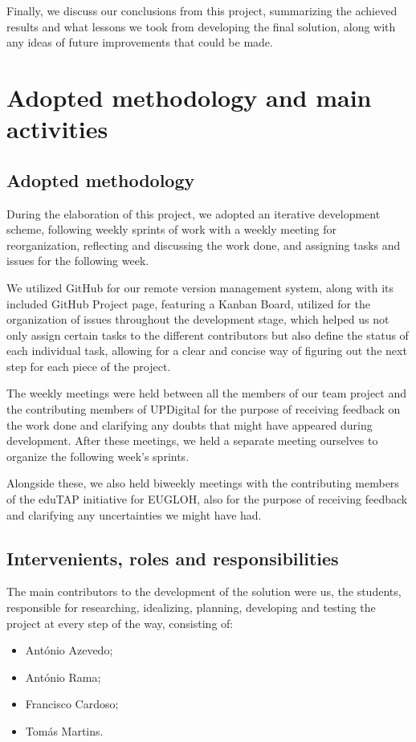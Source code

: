 \documentclass[12pt]{article}
\begin{document}
Finally, we discuss our conclusions from this project, summarizing the achieved results and what lessons we took
from developing the final solution, along with any ideas of future improvements that could be made.

\section{Adopted methodology and main activities}

\subsection{Adopted methodology}

During the elaboration of this project, we adopted an iterative development scheme, following weekly sprints of work with
a weekly meeting for reorganization, reflecting and discussing the work done, and assigning tasks and issues for the following week.

We utilized GitHub\cite{github} for our remote version management system, along with its included GitHub Project\cite{github-project}
page, featuring a Kanban Board\cite{kanban}, utilized for the organization of issues throughout the development stage, which helped
us not only assign certain tasks to the different contributors but also define the status of each individual task, allowing for a
clear and concise way of figuring out the next step for each piece of the project.

The weekly meetings were held between all the members of our team project and the contributing members of UPDigital for the purpose of
receiving feedback on the work done and clarifying any doubts that might have appeared during development. After these meetings, we held
a separate meeting ourselves to organize the following week's sprints.

Alongside these, we also held biweekly meetings with the contributing members of the eduTAP initiative for EUGLOH\cite{eugloh}, also for
the purpose of receiving feedback and clarifying any uncertainties we might have had.


\subsection{Intervenients, roles and responsibilities}

The main contributors to the development of the solution were us, the students, responsible for researching, idealizing, planning,
developing and testing the project at every step of the way, consisting of:
\begin{itemize}
	\item António Azevedo;
	\item António Rama;
	\item Francisco Cardoso;
	\item Tomás Martins.
\end{itemize}
\end{document}
